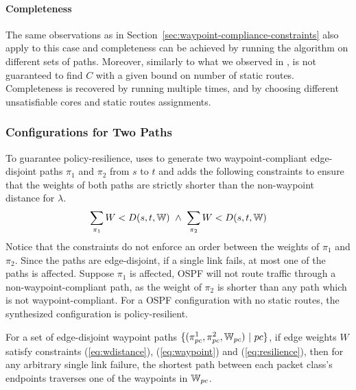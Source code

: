 \paragraph{Completeness}
The same observations as in Section~\ref{sec:waypoint-compliance-constraints}
also apply to this case and completeness can be achieved by running the algorithm
on different sets of paths.
	Moreover, similarly to what we observed in ,  is not 
	guaranteed to find $C$ with a given bound on number of static routes.
Completeness is recovered by running  multiple times, and by choosing different
unsatisfiable cores and static routes assignments. 


\subsubsection{Configurations for Two Paths} \label{sec:ospfresilience}
To guarantee policy-resilience, \name
uses \genesis to generate two waypoint-compliant 
edge-disjoint paths $\pi_1$ and $\pi_2$ from $s$ to $t$
and
adds the following constraints
 to ensure that the  weights 
of both paths are strictly shorter than 
the non-waypoint distance for $\lambda$. 
\begin{equation} \label{eq:resilience}
\sum_{\pi_1}W < D(s,t,\mathbb{W}) ~\wedge~ \sum_{\pi_2}W < D(s,t,\mathbb{W}) 
\end{equation}
Notice that the constraints do not enforce an order between the weights of $\pi_1$ and $\pi_2$.
Since the paths are edge-disjoint, if a single link fails, at most one 
of the paths is affected. Suppose
$\pi_1$ is affected, OSPF will not route traffic through a  
non-waypoint-compliant path, as the weight of $\pi_2$ is shorter 
than any path which is not waypoint-compliant. 
For a OSPF configuration with no static routes,
the synthesized configuration is policy-resilient. 

\begin{theorem}
	For a set of edge-disjoint waypoint paths $\{(\pi^1_{pc}, \pi^2_{pc}, \mathbb{W}_{pc}) ~|~ pc\}$, 
	if edge weights $W$ satisfy constraints (\ref{eq:wdistance}), (\ref{eq:waypoint}) and
	(\ref{eq:resilience}), 
	then for any arbitrary single link failure, 
	the shortest path between each packet class's 
	endpoints traverses one of the waypoints in $\mathbb{W}_{pc}$.
\end{theorem}
\iffull

\fi


